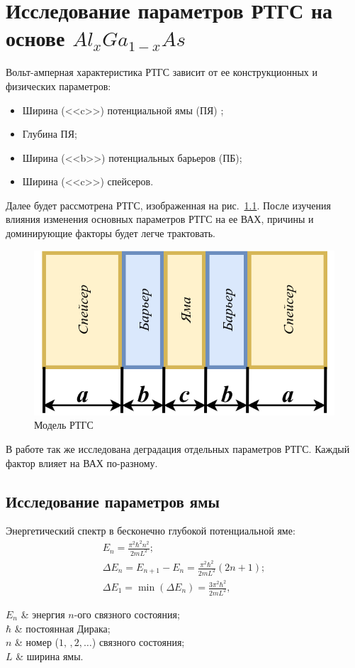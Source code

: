 \chapter{Исследование параметров РТГС на основе $Al_{x}Ga_{1-x}As$}
Вольт-амперная характеристика РТГС зависит от ее конструкционных и физических параметров:
\begin{itemize}
	\item Ширина (<<c>>) потенциальной ямы (ПЯ) ;
	\item Глубина ПЯ;
	\item Ширина (<<b>>) потенциальных барьеров (ПБ);
	\item Ширина (<<c>>) спейсеров.
\end{itemize}

Далее будет рассмотрена РТГС, изображенная на рис.~\ref{fig:RTD}. После изучения влияния изменения основных параметров РТГС на ее ВАХ, причины и доминирующие факторы будет легче трактовать.

\begin{figure}[h!]
	\centering
	\includegraphics[width=0.5\linewidth]{assets/RTD}
	\caption{Модель РТГС}
	\label{fig:RTD}
\end{figure} 

В работе \cite{Vetrova} так же исследована деградация отдельных параметров РТГС. Каждый фактор влияет на ВАХ по-разному.

\section{Исследование параметров ямы}
Энергетический спектр в бесконечно глубокой потенциальной яме:
\begin{gather}
	\label{eq:En}
	E_{n} = \frac{\pi^{2}\hbar^{2}n^{2}}{2mL^{2}};\\
	\Delta E_{n} = E_{n+1} - E_{n} = \frac{\pi^{2}\hbar^{2}}{2mL^{2}}(2n + 1);\\
	\label{eq:dEn1}
	\Delta E_{1} = \min(\Delta E_{n}) = \frac{3\pi^{2}\hbar^{2}}{2mL^{2}},
\end{gather}
\begin{conditions}
	$E_{n}$ & энергия $n$-ого связного состояния;\\
	$\hbar$ & постоянная Дирака;\\
	$n$ & номер ($1,\,,2,\dots$) связного состояния;\\
	$L$ & ширина ямы.
\end{conditions}

